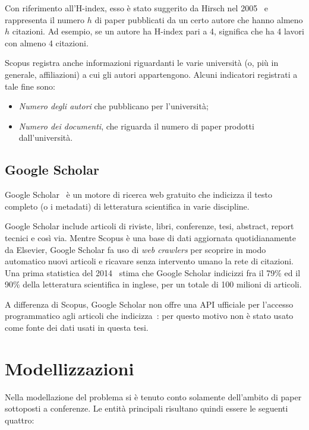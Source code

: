 Con riferimento all'H-index, esso è stato suggerito da Hirsch nel 2005~\cite{hirsch2005}
e rappresenta il numero $h$ di paper pubblicati da un certo autore che hanno
almeno $h$ citazioni. Ad esempio, se un autore ha H-index pari a 4, significa
che ha 4 lavori con almeno 4 citazioni.

Scopus registra anche informazioni riguardanti le varie università (o, più
in generale, affiliazioni) a cui gli autori appartengono. Alcuni indicatori
registrati a tale fine sono:
\begin{itemize}
    \item \textit{Numero degli autori} che pubblicano per l'università;
    \item \textit{Numero dei documenti}, che riguarda il numero di paper prodotti dall'università.
\end{itemize}


\subsection{Google Scholar}\label{sec:google-scholar}

Google Scholar~\cite{scholar} è un motore di ricerca web gratuito che indicizza il testo
completo (o i metadati) di letteratura scientifica in varie discipline.

Google Scholar include articoli di riviste, libri, conferenze, tesi, abstract,
report tecnici e così via.
Mentre Scopus è una base di dati aggiornata quotidianamente da Elsevier, Google
Scholar fa uso di \textit{web crawlers} per scoprire in modo automatico nuovi
articoli e ricavare senza intervento umano la rete di citazioni.
Una prima statistica del 2014~\cite{khabsa2014} stima che Google Scholar
indicizzi fra il 79\% ed il 90\% della letteratura scientifica in inglese,
per un totale di 100 milioni di articoli.

A differenza di Scopus, Google Scholar non offre una API ufficiale per l'accesso
programmatico agli articoli che indicizza~\cite{stackoverflowScholarAPI}: per
questo motivo non è stato usato come fonte dei dati usati in questa tesi.




\section{Modellizzazioni}\label{sec:modellizzazioni}

Nella modellazione del problema si è tenuto conto solamente dell'ambito di
paper sottoposti a conferenze. Le entità principali risultano quindi essere
le seguenti quattro:

